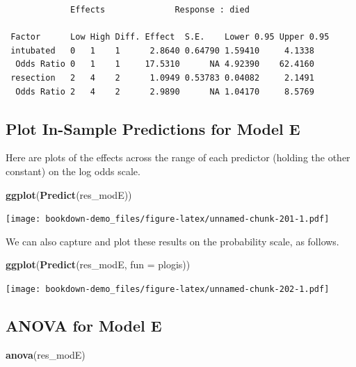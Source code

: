 \documentclass[]{book}
\newenvironment{Shaded}{\begin{snugshade}}{\end{snugshade}}
\newcommand{\KeywordTok}[1]{\textcolor[rgb]{0.13,0.29,0.53}{\textbf{#1}}}
\newcommand{\DataTypeTok}[1]{\textcolor[rgb]{0.13,0.29,0.53}{#1}}
\newcommand{\NormalTok}[1]{#1}
\theoremstyle{definition}
\theoremstyle{definition}
\theoremstyle{definition}
\theoremstyle{remark}
\begin{document}
\begin{verbatim}
             Effects              Response : died 

 Factor      Low High Diff. Effect  S.E.    Lower 0.95 Upper 0.95
 intubated   0   1    1      2.8640 0.64790 1.59410     4.1338   
  Odds Ratio 0   1    1     17.5310      NA 4.92390    62.4160   
 resection   2   4    2      1.0949 0.53783 0.04082     2.1491   
  Odds Ratio 2   4    2      2.9890      NA 1.04170     8.5769   
\end{verbatim}

\subsection{Plot In-Sample Predictions for Model
E}\label{plot-in-sample-predictions-for-model-e}

Here are plots of the effects across the range of each predictor
(holding the other constant) on the log odds scale.

\begin{Shaded}
\begin{Highlighting}[]
\KeywordTok{ggplot}\NormalTok{(}\KeywordTok{Predict}\NormalTok{(res_modE))}
\end{Highlighting}
\end{Shaded}

\texttt{[image: bookdown-demo\_files/figure-latex/unnamed-chunk-201-1.pdf]}

We can also capture and plot these results on the probability scale, as
follows.

\begin{Shaded}
\begin{Highlighting}[]
\KeywordTok{ggplot}\NormalTok{(}\KeywordTok{Predict}\NormalTok{(res_modE, }\DataTypeTok{fun =}\NormalTok{ plogis))}
\end{Highlighting}
\end{Shaded}

\texttt{[image: bookdown-demo\_files/figure-latex/unnamed-chunk-202-1.pdf]}

\subsection{ANOVA for Model E}\label{anova-for-model-e}

\begin{Shaded}
\begin{Highlighting}[]
\KeywordTok{anova}\NormalTok{(res_modE)}
\end{Highlighting}
\end{Shaded}
\end{document}
